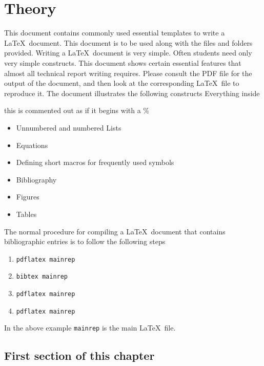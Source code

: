 

\chapter{Theory}


This document contains commonly used essential templates to write a
\LaTeX\ document. This document is to be used along with the files and
folders provided. Writing a \LaTeX\ document is very simple.  Often
students need only very simple constructs.  This document shows
certain essential features that almost all technical report writing
requires. Please consult the PDF file for the output of the document,
and then look at the corresponding \LaTeX\ file to reproduce it.  The
document illustrates the following constructs
Everything inside 

this is commented out as if it begins with a  \% \verb| |
\begin{itemize}
\item Unnumbered and numbered Lists
\item Equations
\item Defining short macros for frequently used symbols
\item Bibliography
\item Figures
\item Tables
\end{itemize}

The normal procedure for compiling a \LaTeX\ document that contains
bibliographic entries is to follow the following steps
\begin{enumerate}
\item \verb|pdflatex mainrep|
\item \verb|bibtex mainrep|
\item \verb|pdflatex mainrep|
\item \verb|pdflatex mainrep|
\end{enumerate}
In the above example \verb|mainrep| is the main \LaTeX\ file.


\section{First section of this chapter}

